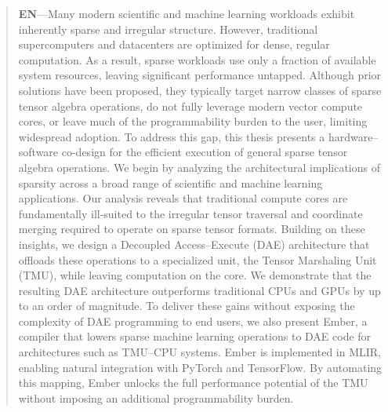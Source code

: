 \begin{abstract}
\textbf{EN}---Many modern scientific and machine learning workloads exhibit inherently sparse and irregular structure. However, traditional supercomputers and datacenters are optimized for dense, regular computation. As a result, sparse workloads use only a fraction of available system resources, leaving significant performance untapped. Although prior solutions have been proposed, they typically target narrow classes of sparse tensor algebra operations, do not fully leverage modern vector compute cores, or leave much of the programmability burden to the user, limiting widespread adoption. To address this gap, this thesis presents a hardware--software co-design for the efficient execution of general sparse tensor algebra operations. We begin by analyzing the architectural implications of sparsity across a broad range of scientific and machine learning applications. Our analysis reveals that traditional compute cores are fundamentally ill-suited to the irregular tensor traversal and coordinate merging required to operate on sparse tensor formats. Building on these insights, we design a Decoupled Access--Execute (DAE) architecture that offloads these operations to a specialized unit, the Tensor Marshaling Unit (TMU), while leaving computation on the core. We demonstrate that the resulting DAE architecture outperforms traditional CPUs and GPUs by up to an order of magnitude. To deliver these gains without exposing the complexity of DAE programming to end users, we also present Ember, a compiler that lowers sparse machine learning operations to DAE code for architectures such as TMU--CPU systems. Ember is implemented in MLIR, enabling natural integration with PyTorch and TensorFlow. By automating this mapping, Ember unlocks the full performance potential of the TMU without imposing an additional programmability burden.
\end{abstract}

